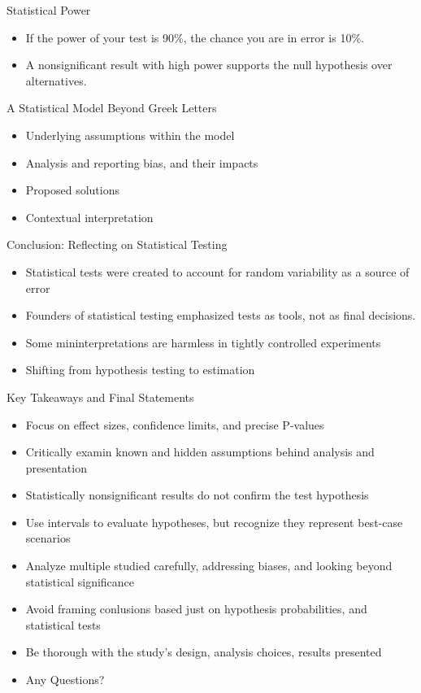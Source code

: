 \documentclass[aspectratio=169, 12pt]{beamer}
\begin{document}
\begin{frame}{Statistical Power} %
\begin{itemize}
    \item If the power of your test is 90\%, the chance you are in error is 10\%.
    \item A nonsignificant result with high power supports the null hypothesis over alternatives.
\end{itemize}
\end{frame}

\begin{frame}{A Statistical Model Beyond Greek Letters}
\begin{itemize}
    \item Underlying assumptions within the model
    \item Analysis and reporting bias, and their impacts
    \item Proposed solutions
    \item Contextual interpretation
\end{itemize}
\end{frame}

\begin{frame}{Conclusion: Reflecting on Statistical Testing}
\begin{itemize}
    \item Statistical tests were created to account for random variability as a source of error
    \item Founders of statistical testing emphasized tests as tools, not as final decisions.
    \item Some mininterpretations are harmless in tightly controlled experiments
    \item Shifting from hypothesis testing to estimation
\end{itemize}
\end{frame}

\begin{frame}{Key Takeaways and Final Statements}
\begin{itemize}
    \item Focus on effect sizes, confidence limits, and precise P-values
    \item Critically examin known and hidden assumptions behind analysis and presentation
    \item Statistically nonsignificant results do not confirm the test hypothesis
    \item Use intervals to evaluate hypotheses, but recognize they represent best-case scenarios
    \item Analyze multiple studied carefully, addressing biases, and looking beyond statistical significance
    \item Avoid framing conlusions based just on hypothesis probabilities, and statistical tests
    \item Be thorough with the study's design, analysis choices, results presented
\end{itemize}
\end{frame}

\begin{frame}{}
\begin{itemize}
    \item Any Questions?
\end{itemize}
\end{frame}
\end{document}
